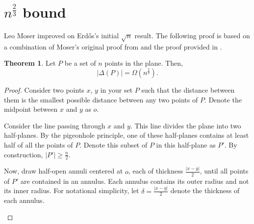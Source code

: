 \documentclass{scrippsthesisclass}
\theoremstyle{definition}
\newtheorem{theorem}{Theorem}[section]
\begin{document}
\section{$n^{\frac{2}{3}}$ bound} 
Leo Moser improved on Erd\H{o}s's initial $\sqrt{n}$ result. The following proof is based on a combination of Moser's original proof from \cite{Moser52} and the proof provided in \cite{thebook}.
\begin{theorem}
    Let $P$ be a set of $n$ points in the plane. Then, 
    \[
    |\Delta(P)| = \Omega \left(n^{\frac{2}{3}}\right).
    \]
\end{theorem}
\begin{proof}
    Consider two points $x$, $y$ in your set $P$ such that the distance between them is the smallest possible distance between any two points of $P$. 
    Denote the midpoint between $x$ and $y$ as $o$. 
    
    Consider the line passing through $x$ and $y$.
    This line divides the plane into two half-planes.
    By the pigeonhole principle, one of these half-planes contains at least half of all the points of $P$. 
    Denote this subset of $P$ in this half-plane as $P'$.
    By construction, $|P'| \geq \frac{n}{2}$. 
    
    Now, draw half-open annuli centered at $o$, each of thickness $\frac{|x-y|}{2}$, until all points of $P'$ are contained in an annulus. 
    Each annulus contains its outer radius and not its inner radius.
    For notational simplicity, let $\delta = \frac{|x-y|}{2}$ denote the thickness of each annulus. 
    \begin{center}
\end{center}
\end{proof}
\end{document}
